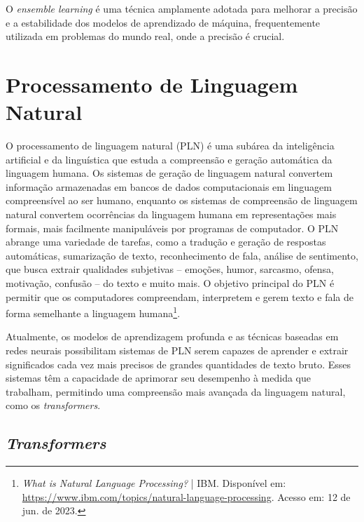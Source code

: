 O \textit{ensemble learning} é uma técnica amplamente adotada para melhorar a precisão e a estabilidade dos modelos de aprendizado de máquina, frequentemente utilizada em problemas do mundo real, onde a precisão é crucial.

\section{Processamento de Linguagem Natural}

O processamento de linguagem natural (PLN) é uma subárea da inteligência artificial e da linguística que estuda a compreensão e geração automática da linguagem humana. Os sistemas de geração de linguagem natural convertem informação armazenadas em bancos de dados computacionais em linguagem compreensível ao ser humano, enquanto os sistemas de compreensão de linguagem natural convertem ocorrências da linguagem humana em representações mais formais, mais facilmente manipuláveis por programas de computador. O PLN abrange uma variedade de tarefas, como a tradução e geração de respostas automáticas, sumarização de texto, reconhecimento de fala, análise de sentimento, que busca extrair qualidades subjetivas – emoções, humor, sarcasmo, ofensa, motivação, confusão – do texto e muito mais. O objetivo principal do PLN é permitir que os computadores compreendam, interpretem e gerem texto e fala de forma semelhante a linguagem humana\footnote{\textit{What is Natural Language Processing?} | IBM. Disponível em: \url{https://www.ibm.com/topics/natural-language-processing}. Acesso em: 12 de jun. de 2023.}.

Atualmente, os modelos de aprendizagem profunda e as técnicas baseadas em redes neurais possibilitam sistemas de PLN serem capazes de aprender e extrair significados cada vez mais precisos de grandes quantidades de texto bruto. Esses sistemas têm a capacidade de aprimorar seu desempenho à medida que trabalham, permitindo uma compreensão mais avançada da linguagem natural, como os \textit{transformers}.

\subsection{\textit{Transformers}}

